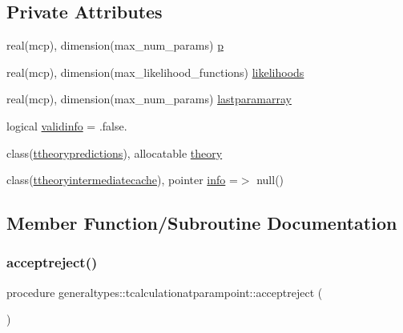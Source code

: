 \subsection*{Private Attributes}
\begin{DoxyCompactItemize}
\item 
real(mcp), dimension(max\+\_\+num\+\_\+params) \mbox{\hyperlink{structgeneraltypes_1_1tcalculationatparampoint_ad2c9f50c292747c27ac2ff85f7c85cd1}{p}}
\item 
real(mcp), dimension(max\+\_\+likelihood\+\_\+functions) \mbox{\hyperlink{structgeneraltypes_1_1tcalculationatparampoint_ad50c763a493d06d0e52e756e319d7108}{likelihoods}}
\item 
real(mcp), dimension(max\+\_\+num\+\_\+params) \mbox{\hyperlink{structgeneraltypes_1_1tcalculationatparampoint_ac1121c140d321db96db73ed239a54794}{lastparamarray}}
\item 
logical \mbox{\hyperlink{structgeneraltypes_1_1tcalculationatparampoint_a9e1654eea11b394f3055429ec0d750d8}{validinfo}} = .false.
\item 
class(\mbox{\hyperlink{structgeneraltypes_1_1ttheorypredictions}{ttheorypredictions}}), allocatable \mbox{\hyperlink{structgeneraltypes_1_1tcalculationatparampoint_af964f378f33cb31b125103d7672a3920}{theory}}
\item 
class(\mbox{\hyperlink{structgeneraltypes_1_1ttheoryintermediatecache}{ttheoryintermediatecache}}), pointer \mbox{\hyperlink{structgeneraltypes_1_1tcalculationatparampoint_a7fe8c0108af2970f3e3b7dcd2b8782ed}{info}} =$>$ null()
\end{DoxyCompactItemize}


\subsection{Member Function/\+Subroutine Documentation}
\mbox{\label{structgeneraltypes_1_1tcalculationatparampoint_a4b46b0e6d794fc4c30a127d715abce03}} 
\subsubsection{\texorpdfstring{acceptreject()}{acceptreject()}}
{\footnotesize\ttfamily procedure generaltypes\+::tcalculationatparampoint\+::acceptreject (\begin{DoxyParamCaption}{ }\end{DoxyParamCaption})\hspace{0.3cm}{\ttfamily [private]}}

